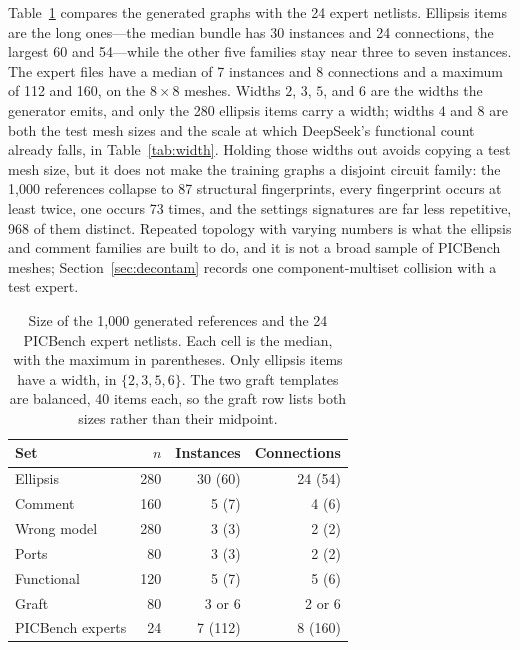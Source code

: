 \documentclass[11pt]{article}
\begin{document}
Table~\ref{tab:size} compares the generated graphs with the 24 expert netlists.
Ellipsis items are the long ones---the median bundle has 30 instances and 24 connections, the largest 60 and 54---while the other five families stay near three to seven instances.
The expert files have a median of 7 instances and 8 connections and a maximum of 112 and 160, on the $8\times8$ meshes.
Widths $2$, $3$, $5$, and $6$ are the widths the generator emits, and only the 280 ellipsis items carry a width; widths $4$ and $8$ are both the test mesh sizes and the scale at which DeepSeek's functional count already falls, in Table~\ref{tab:width}.
Holding those widths out avoids copying a test mesh size, but it does not make the training graphs a disjoint circuit family: the 1{,}000 references collapse to 87 structural fingerprints, every fingerprint occurs at least twice, one occurs 73 times, and the settings signatures are far less repetitive, 968 of them distinct.
Repeated topology with varying numbers is what the ellipsis and comment families are built to do, and it is not a broad sample of PICBench meshes; Section~\ref{sec:decontam} records one component-multiset collision with a test expert.

\begin{table}[H]
\caption{Size of the 1{,}000 generated references and the 24 PICBench expert netlists.
Each cell is the median, with the maximum in parentheses.
Only ellipsis items have a width, in $\{2,3,5,6\}$.
The two graft templates are balanced, 40 items each, so the graft row lists both sizes rather than their midpoint.}
\label{tab:size}
\begin{center}
\begin{small}
\begin{tabular}{lrrr}
\toprule
Set & $n$ & Instances & Connections \\
\midrule
Ellipsis & 280 & 30 (60) & 24 (54) \\
Comment & 160 & 5 (7) & 4 (6) \\
Wrong model & 280 & 3 (3) & 2 (2) \\
Ports & 80 & 3 (3) & 2 (2) \\
Functional & 120 & 5 (7) & 5 (6) \\
Graft & 80 & 3 or 6 & 2 or 6 \\
\midrule
PICBench experts & 24 & 7 (112) & 8 (160) \\
\bottomrule
\end{tabular}
\end{small}
\end{center}
\end{table}
\end{document}

